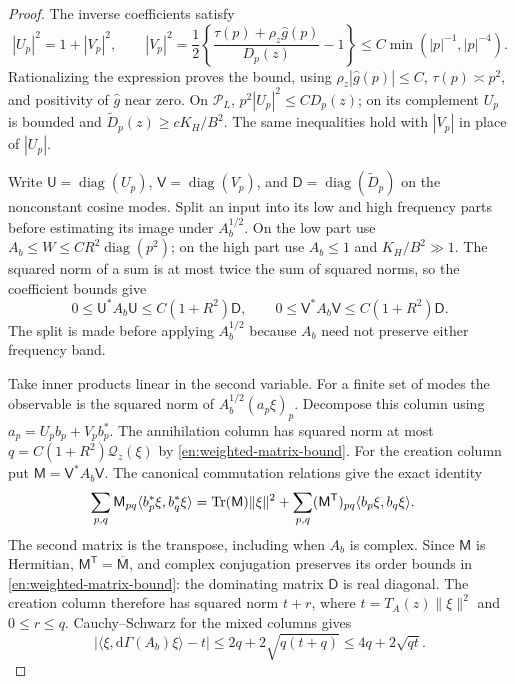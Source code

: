 \begin{proof}
The inverse coefficients satisfy
\begin{equation}\label{en:UV-bounds}
 |U_p|^2=1+|V_p|^2,\qquad
 |V_p|^2=\frac12\left\{
 \frac{\tau(p)+\rho_z\widehat g(p)}{D_p(z)}-1\right\}
       \le C\min(|p|^{-1},|p|^{-4}).
\end{equation}
Rationalizing the expression proves the bound, using
$\rho_z|\widehat g(p)|\le C$, $\tau(p)\asymp p^2$, and positivity
of $\widehat g$ near zero.  On $\mathcal P_L$,
$p^2|U_p|^2\le CD_p(z)$; on its complement $U_p$ is bounded and
$\widetilde D_p(z)\ge cK_H/B^2$.  The same inequalities hold with
$|V_p|$ in place of $|U_p|$.

Write $\mathsf U=\operatorname{diag}(U_p)$,
$\mathsf V=\operatorname{diag}(V_p)$, and
$\mathsf D=\operatorname{diag}(\widetilde D_p)$ on the nonconstant
cosine modes.  Split an input into its low and high frequency parts
before estimating its image under $A_b^{1/2}$.  On the low part use
$A_b\le W\le CR^2\operatorname{diag}(p^2)$; on the high part use
$A_b\le1$ and $K_H/B^2\gg1$.  The squared norm of a sum is at most
twice the sum of squared norms, so the coefficient bounds give
\begin{equation}\label{en:weighted-matrix-bound}
 0\le\mathsf U^*A_b\mathsf U\le C(1+R^2)\mathsf D,
 \qquad
 0\le\mathsf V^*A_b\mathsf V\le C(1+R^2)\mathsf D.
\end{equation}
The split is made before applying $A_b^{1/2}$ because $A_b$ need not
preserve either frequency band.

Take inner products linear in the second variable.  For a finite set
of modes the observable is the squared norm of
$A_b^{1/2}(a_p\xi)_p$.  Decompose this column using
$a_p=U_pb_p+V_pb_p^*$.  The annihilation column has squared norm at
most $q=C(1+R^2)\mathcal Q_z(\xi)$ by
\eqref{en:weighted-matrix-bound}.  For the creation column put
$\mathsf M=\mathsf V^*A_b\mathsf V$.  The canonical commutation
relations give the exact identity
\begin{align}
 \sum_{p,q}\mathsf M_{pq}\langle b_p^*\xi,b_q^*\xi\rangle
 &=\operatorname{Tr}(\mathsf M)\|\xi\|^2
   +\sum_{p,q}(\mathsf M^{\mathsf T})_{pq}
                           \langle b_p\xi,b_q\xi\rangle.
 \label{en:transpose-identity}
\end{align}
The second matrix is the transpose, including when $A_b$ is complex.
Since $\mathsf M$ is Hermitian,
$\mathsf M^{\mathsf T}=\overline{\mathsf M}$, and complex
conjugation preserves its order bounds in
\eqref{en:weighted-matrix-bound}: the dominating matrix $\mathsf D$
is real diagonal.  The creation column therefore has squared norm
$t+r$, where $t=T_A(z)\|\xi\|^2$ and $0\le r\le q$.
Cauchy--Schwarz for the mixed columns gives
\[
 \left|\langle\xi,\mathrm d\Gamma(A_b)\xi\rangle-t\right|
       \le2q+2\sqrt{q(t+q)}\le4q+2\sqrt{qt}.
\]


\end{proof}
